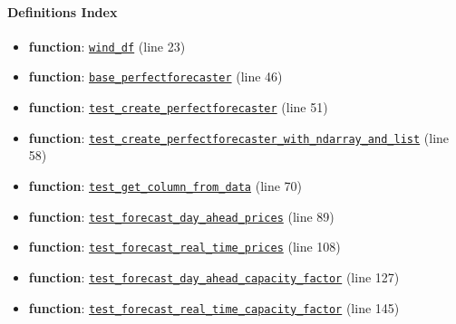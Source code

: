 \documentclass[11pt]{report}
\begin{document}
\paragraph{Definitions Index}
\begin{itemize}[leftmargin=*]
  \item \textbf{function}: \hyperref[def:tests-test_perfectforecaster.py:wind_df:L23]{\texttt{wind\_df}} (line 23)
  \item \textbf{function}: \hyperref[def:tests-test_perfectforecaster.py:base_perfectforecaster:L46]{\texttt{base\_perfectforecaster}} (line 46)
  \item \textbf{function}: \hyperref[def:tests-test_perfectforecaster.py:test_create_perfectforecaster:L51]{\texttt{test\_create\_perfectforecaster}} (line 51)
  \item \textbf{function}: \hyperref[def:tests-test_perfectforecaster.py:test_create_perfectforecaster_with_ndarray_and_list:L58]{\texttt{test\_create\_perfectforecaster\_with\_ndarray\_and\_list}} (line 58)
  \item \textbf{function}: \hyperref[def:tests-test_perfectforecaster.py:test_get_column_from_data:L70]{\texttt{test\_get\_column\_from\_data}} (line 70)
  \item \textbf{function}: \hyperref[def:tests-test_perfectforecaster.py:test_forecast_day_ahead_prices:L89]{\texttt{test\_forecast\_day\_ahead\_prices}} (line 89)
  \item \textbf{function}: \hyperref[def:tests-test_perfectforecaster.py:test_forecast_real_time_prices:L108]{\texttt{test\_forecast\_real\_time\_prices}} (line 108)
  \item \textbf{function}: \hyperref[def:tests-test_perfectforecaster.py:test_forecast_day_ahead_capacity_factor:L127]{\texttt{test\_forecast\_day\_ahead\_capacity\_factor}} (line 127)
  \item \textbf{function}: \hyperref[def:tests-test_perfectforecaster.py:test_forecast_real_time_capacity_factor:L145]{\texttt{test\_forecast\_real\_time\_capacity\_factor}} (line 145)
\end{itemize}
\end{document}
